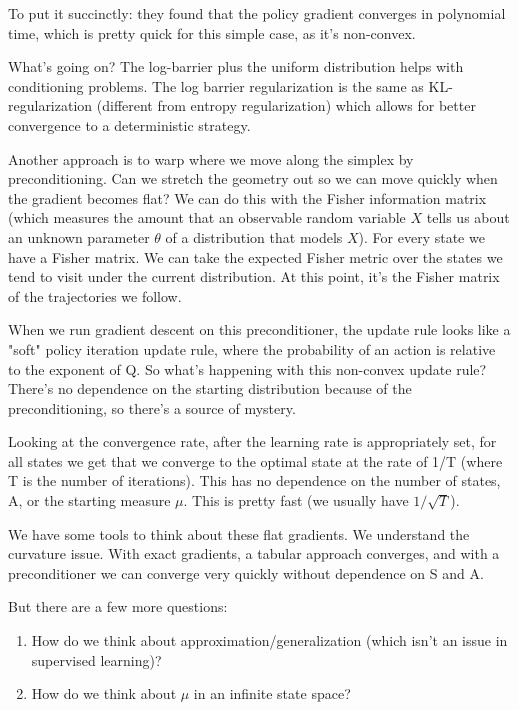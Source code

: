 \documentclass[12pt,reqno]{amsart}
\begin{document}
To put it succinctly: they found that the policy gradient converges in polynomial time, which is pretty quick for this simple case, as it's non-convex.

What's going on? The log-barrier plus the uniform distribution helps with conditioning problems. The log barrier regularization is the same as KL-regularization (different from entropy regularization) which allows for better convergence to a deterministic strategy.

Another approach is to warp where we move along the simplex by preconditioning. Can we stretch the geometry out so we can move quickly when the gradient becomes flat?
        We can do this with the Fisher information matrix (which measures the amount that an observable random variable $X$ tells us about an unknown parameter $\theta$ of a distribution that models $X$).
        For every state we have a Fisher matrix. We can take the expected Fisher metric over the states we tend to visit under the current distribution. At this point, it's the Fisher matrix of the trajectories we follow. 
        
        When we run gradient descent on this preconditioner, the update rule looks like a "soft" policy iteration update rule, where the probability of an action is relative to the exponent of Q. So what's happening with this non-convex update rule? There's no dependence on the starting distribution because of the preconditioning, so there's a source of mystery.

Looking at the convergence rate, after the learning rate is appropriately set, for all states we get that we converge to the optimal state at the rate of 1/T (where T is the number of iterations). This has no dependence on the number of states, A, or the starting measure $\mu$. This is pretty fast (we usually have $1/\sqrt{T}$).

We have some tools to think about these flat gradients. We understand the curvature issue. With exact gradients, a tabular approach converges, and with a preconditioner we can converge very quickly without dependence on S and A.

But there are a few more questions:
\begin{enumerate}

\item How do we think about approximation/generalization (which isn't an issue in supervised learning)? \\

\item How do we think about $\mu$ in an infinite state space?\\

\end{enumerate}
\end{document}
